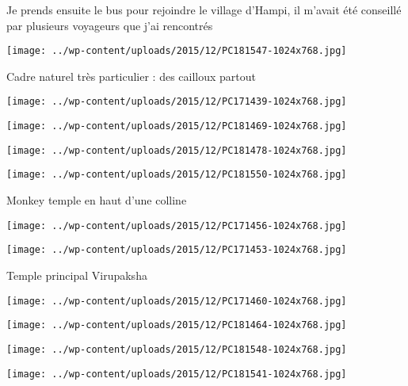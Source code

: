  \newline
 Je prends ensuite le bus pour rejoindre le village d'Hampi, il m'avait été conseillé par plusieurs voyageurs que j'ai rencontrés \newline
 \newline
\centerline{\texttt{[image: ../wp-content/uploads/2015/12/PC181547-1024x768.jpg]} } 
 \newline
 Cadre naturel très particulier : des cailloux partout \newline
 \newline
\centerline{\texttt{[image: ../wp-content/uploads/2015/12/PC171439-1024x768.jpg]} } 
 \newline
 \newline
\centerline{\texttt{[image: ../wp-content/uploads/2015/12/PC181469-1024x768.jpg]} } 
 \newline
 \newline
\centerline{\texttt{[image: ../wp-content/uploads/2015/12/PC181478-1024x768.jpg]} } 
 \newline
 \newline
\centerline{\texttt{[image: ../wp-content/uploads/2015/12/PC181550-1024x768.jpg]} } 
 \newline
 Monkey temple en haut d'une colline \newline
 \newline
\centerline{\texttt{[image: ../wp-content/uploads/2015/12/PC171456-1024x768.jpg]} } 
 \newline
 \newline
\centerline{\texttt{[image: ../wp-content/uploads/2015/12/PC171453-1024x768.jpg]} } 
 \newline
 Temple principal Virupaksha \newline
 \newline
\centerline{\texttt{[image: ../wp-content/uploads/2015/12/PC171460-1024x768.jpg]} } 
 \newline
 \newline
\centerline{\texttt{[image: ../wp-content/uploads/2015/12/PC181464-1024x768.jpg]} } 
 \newline
 \newline
\centerline{\texttt{[image: ../wp-content/uploads/2015/12/PC181548-1024x768.jpg]} } 
 \newline
 \newline
\centerline{\texttt{[image: ../wp-content/uploads/2015/12/PC181541-1024x768.jpg]} } 

